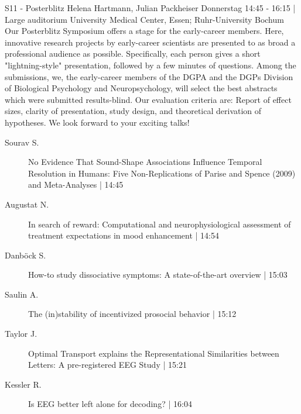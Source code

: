 
            \begin{symposium}
            {S11 - Posterblitz}
            {Helena Hartmann, Julian Packheiser}
            {Donnerstag 14:45 - 16:15 | Large auditorium}
            {University Medical Center, Essen; Ruhr-University Bochum}
            Our Posterblitz Symposium offers a stage for the early-career members. Here, innovative research projects by early-career scientists are presented to as broad a professional audience as possible. Specifically, each person gives a short "lightning-style" presentation, followed by a few minutes of questions. Among the submissions, we, the early-career members of the DGPA and the DGPs Division of Biological Psychology and Neuropsychology, will select the best abstracts which were submitted results-blind. Our evaluation criteria are: Report of effect sizes, clarity of presentation, study design, and theoretical derivation of hypotheses. We look forward to your exciting talks! 
            \begin{description}    
            
                \item [ Sourav S.] No Evidence That Sound-Shape Associations Influence Temporal Resolution in Humans: Five Non-Replications of Parise and Spence (2009) and Meta-Analyses \textcolor{mygray}{ | 14:45}    
                
                \item [ Augustat N.] In search of reward: Computational and neurophysiological assessment of treatment expectations in mood enhancement \textcolor{mygray}{ | 14:54}    
                
                \item [ Danböck S.] How-to study dissociative symptoms: A state-of-the-art overview \textcolor{mygray}{ | 15:03}    
                
                \item [ Saulin A.] The (in)stability of incentivized prosocial behavior \textcolor{mygray}{ | 15:12}    
                
                \item [ Taylor J.] Optimal Transport explains the Representational Similarities between Letters: A pre-registered EEG Study \textcolor{mygray}{ | 15:21}    
                
                \item [ Kessler R.] Is EEG better left alone for decoding? \textcolor{mygray}{ | 16:04}    
                

\end{description}
\end{symposium}
